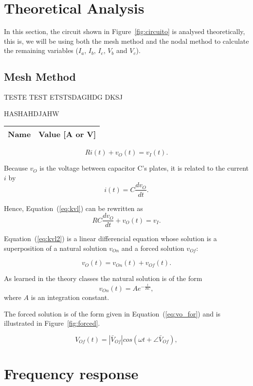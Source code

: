 \section{Theoretical Analysis}
\label{sec:analysis}

In this section, the circuit shown in Figure~\ref{fig:circuito} is analysed
theoretically, this is, we will be using both the mesh method and the nodal method to calculate the remaining variables ($I_a$, $I_b$, $I_c$, $V_b$ and $V_c$).

\subsection{Mesh Method}

TESTE TEST ETSTSDAGHDG
DKSJ \par
HASHAHDJAHW

\begin{center}
  \begin{tabular}{ | c | c | }
    \hline    
    {\bf Name} & {\bf Value [A or V]} \\ \hline
    
    \hline
  \end{tabular}
\end{center}

\begin{equation}
  Ri(t) + v_O(t) = v_I(t).
  \label{eq:kvl}
\end{equation}

Because $v_O$ is the voltage between capacitor C's plates, it is related to the
current $i$ by
\begin{equation}
  i(t) = C\frac{dv_O}{dt}.
\end{equation}

Hence, Equation~(\ref{eq:kvl}) can be rewritten as
\begin{equation}
  RC\frac{dv_O}{dt} + v_O(t) = v_I.
  \label{eq:kvl2}
\end{equation}

Equation~(\ref{eq:kvl2}) is a linear differencial equation whose solution is a
superposition of a natural solution $v_{On}$ and a forced solution $v_{Of}$:

\begin{equation}
  v_O(t) = v_{On}(t) + v_{Of}(t).
  \label{eq:vo_sol}
\end{equation}

As learned in the theory classes the natural solution is of the form
\begin{equation}
  v_{On}(t) = Ae^{-\frac{t}{RC}},
  \label{eq:vo_nat}
\end{equation}
where $A$ is an integration constant.

The forced solution is of the form given in Equation~(\ref{eq:vo_for}) and is
illustrated in Figure~\ref{fig:forced}.

\begin{equation}
  V_{Of}(t) = |\bar{V}_{Of}| cos(\omega t + \angle \bar{V}_{Of}),
  \label{eq:vo_for}
\end{equation}

\lipsum[1-1]

\section{Frequency response}

\lipsum[1-1]


